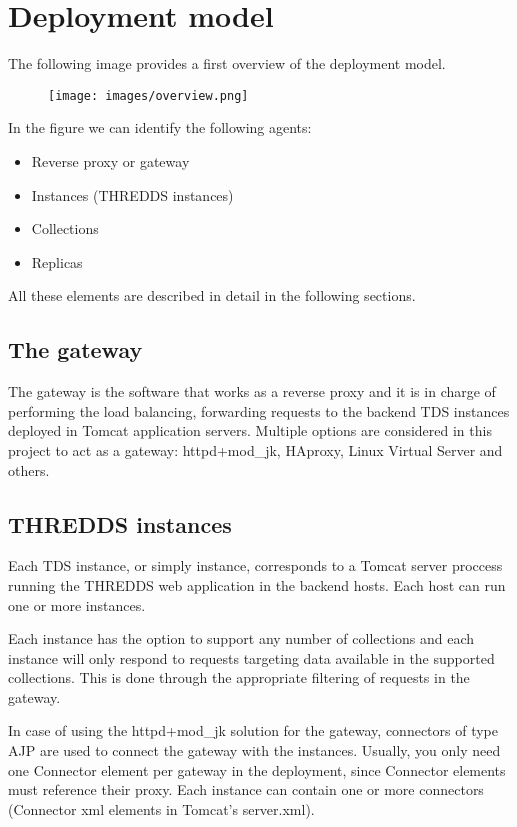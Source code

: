 \documentclass[a4paper,12pt]{article}
\begin{document}
\section{Deployment model}

The following image provides a first overview of the deployment model.

\begin{figure}[h]
\texttt{[image: images/overview.png]}
\end{figure}

In the figure we can identify the following agents:

\begin{itemize}
\item Reverse proxy or gateway
\item Instances (THREDDS instances)
\item Collections
\item Replicas
\end{itemize}

All these elements are described in detail in the following sections.

\subsection{The gateway}

The gateway is the software that works as a reverse proxy and it is in charge of performing the load balancing, forwarding requests to the backend TDS instances deployed in Tomcat application servers. Multiple options are considered in this project to act as a gateway: httpd+mod\_jk, HAproxy, Linux Virtual Server and others.

\subsection{THREDDS instances}

Each TDS instance, or simply instance, corresponds to a Tomcat server proccess running the THREDDS web application in the backend hosts. Each host can run one or more instances. 

Each instance has the option to support any number of collections and each instance will only respond to requests targeting data available in the supported collections. This is done through the appropriate filtering of requests in the gateway.

In case of using the httpd+mod\_jk solution for the gateway, connectors of type AJP are used to connect the gateway with the instances. Usually, you only need one Connector element per gateway in the deployment, since Connector elements must reference their proxy.  Each instance can contain one or more connectors (Connector xml elements in Tomcat's server.xml).
\end{document}

